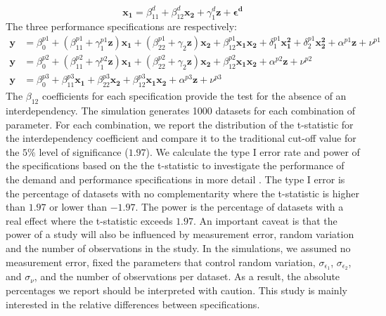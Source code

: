 \documentclass[12pt]{article}
\begin{document}
\begin{equation*}
\mathbf{x_1} = \beta^d_{11} + \beta^d_{12} \mathbf{x_2} + \gamma_1^d \mathbf{z} 
		+ \mathbf{\epsilon^d}
\end{equation*}
The three performance specifications are respectively: 
\begin{align*}
\mathbf{y} &=  \beta^{p1}_0 + (\beta^{p1}_{11} + \gamma_1^{p1} \mathbf{z} )\mathbf{x_1} 
						+ (\beta_{22}^{p1} + \gamma_2 \mathbf{z} ) \mathbf{x_2} 
                        + \beta_{12}^{p1} \mathbf{x_1} \mathbf{x_2} 
                        + \delta_1^{p1} \mathbf{x^2_1} + \delta_2^{p1} \mathbf{x^2_2} 
                        + \alpha^{p1} \mathbf{z}
                        + \nu^{p1} \\
 \mathbf{y} &=  \beta^{p2}_0 + (\beta^{p2}_{11} + \gamma_1^{p2} \mathbf{z} )\mathbf{x_1} 
						+ (\beta_{22}^{p2} + \gamma_2 \mathbf{z} ) \mathbf{x_2} 
                        + \beta_{12}^{p2} \mathbf{x_1} \mathbf{x_2} 
                        + \alpha^{p2} \mathbf{z}
                        + \nu^{p2} \\
 \mathbf{y} &=  \beta^{p3}_0 + \beta^{p3}_{11} \mathbf{x_1} 
						+ \beta_{22}^{p3} \mathbf{x_2} 
                        + \beta_{12}^{p3} \mathbf{x_1} \mathbf{x_2} 
                        + \alpha^{p3} \mathbf{z}
                        + \nu^{p3}
\end{align*}
The $\beta_{12}$ coefficients for each specification provide the test for the absence of an interdependency. The simulation generates 1000 datasets for each combination of parameter. For each combination, we report the distribution of the t-statistic for the interdependency coefficient and compare it to the traditional cut-off value for the $5\%$ level of significance ($1.97$). We calculate the type I error rate and power of the specifications based on the the t-statistic to investigate the performance of the demand and performance specifications in more detail . The type I error is the percentage of datasets with no complementarity where the t-statistic is higher than \(1.97\) or lower than \(-1.97\). The power is the percentage of datasets with a real effect where the t-statistic exceeds \(1.97\). An important caveat is that the power of a study will also be influenced by measurement error, random variation and the number of observations in the study. In the simulations, we assumed no measurement error, fixed the parameters that control random variation, \(\sigma_{\epsilon_1}\), \(\sigma_{\epsilon_2}\), and \(\sigma_{\nu}\), and the number of observations per dataset. As a result, the absolute percentages we report should be interpreted with caution. This study is mainly interested in the relative differences between specifications. 
\end{document}
